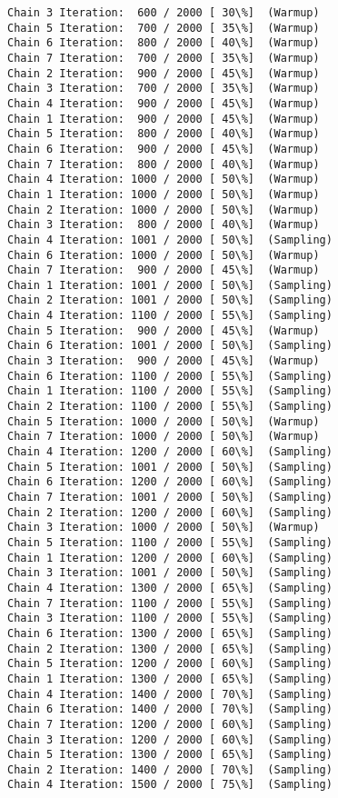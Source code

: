 \documentclass[11pt]{article}
\begin{document}
\begin{Verbatim}[commandchars=\\\{\}]
Chain 3 Iteration:  600 / 2000 [ 30\%]  (Warmup)
Chain 5 Iteration:  700 / 2000 [ 35\%]  (Warmup)
Chain 6 Iteration:  800 / 2000 [ 40\%]  (Warmup)
Chain 7 Iteration:  700 / 2000 [ 35\%]  (Warmup)
Chain 2 Iteration:  900 / 2000 [ 45\%]  (Warmup)
Chain 3 Iteration:  700 / 2000 [ 35\%]  (Warmup)
Chain 4 Iteration:  900 / 2000 [ 45\%]  (Warmup)
Chain 1 Iteration:  900 / 2000 [ 45\%]  (Warmup)
Chain 5 Iteration:  800 / 2000 [ 40\%]  (Warmup)
Chain 6 Iteration:  900 / 2000 [ 45\%]  (Warmup)
Chain 7 Iteration:  800 / 2000 [ 40\%]  (Warmup)
Chain 4 Iteration: 1000 / 2000 [ 50\%]  (Warmup)
Chain 1 Iteration: 1000 / 2000 [ 50\%]  (Warmup)
Chain 2 Iteration: 1000 / 2000 [ 50\%]  (Warmup)
Chain 3 Iteration:  800 / 2000 [ 40\%]  (Warmup)
Chain 4 Iteration: 1001 / 2000 [ 50\%]  (Sampling)
Chain 6 Iteration: 1000 / 2000 [ 50\%]  (Warmup)
Chain 7 Iteration:  900 / 2000 [ 45\%]  (Warmup)
Chain 1 Iteration: 1001 / 2000 [ 50\%]  (Sampling)
Chain 2 Iteration: 1001 / 2000 [ 50\%]  (Sampling)
Chain 4 Iteration: 1100 / 2000 [ 55\%]  (Sampling)
Chain 5 Iteration:  900 / 2000 [ 45\%]  (Warmup)
Chain 6 Iteration: 1001 / 2000 [ 50\%]  (Sampling)
Chain 3 Iteration:  900 / 2000 [ 45\%]  (Warmup)
Chain 6 Iteration: 1100 / 2000 [ 55\%]  (Sampling)
Chain 1 Iteration: 1100 / 2000 [ 55\%]  (Sampling)
Chain 2 Iteration: 1100 / 2000 [ 55\%]  (Sampling)
Chain 5 Iteration: 1000 / 2000 [ 50\%]  (Warmup)
Chain 7 Iteration: 1000 / 2000 [ 50\%]  (Warmup)
Chain 4 Iteration: 1200 / 2000 [ 60\%]  (Sampling)
Chain 5 Iteration: 1001 / 2000 [ 50\%]  (Sampling)
Chain 6 Iteration: 1200 / 2000 [ 60\%]  (Sampling)
Chain 7 Iteration: 1001 / 2000 [ 50\%]  (Sampling)
Chain 2 Iteration: 1200 / 2000 [ 60\%]  (Sampling)
Chain 3 Iteration: 1000 / 2000 [ 50\%]  (Warmup)
Chain 5 Iteration: 1100 / 2000 [ 55\%]  (Sampling)
Chain 1 Iteration: 1200 / 2000 [ 60\%]  (Sampling)
Chain 3 Iteration: 1001 / 2000 [ 50\%]  (Sampling)
Chain 4 Iteration: 1300 / 2000 [ 65\%]  (Sampling)
Chain 7 Iteration: 1100 / 2000 [ 55\%]  (Sampling)
Chain 3 Iteration: 1100 / 2000 [ 55\%]  (Sampling)
Chain 6 Iteration: 1300 / 2000 [ 65\%]  (Sampling)
Chain 2 Iteration: 1300 / 2000 [ 65\%]  (Sampling)
Chain 5 Iteration: 1200 / 2000 [ 60\%]  (Sampling)
Chain 1 Iteration: 1300 / 2000 [ 65\%]  (Sampling)
Chain 4 Iteration: 1400 / 2000 [ 70\%]  (Sampling)
Chain 6 Iteration: 1400 / 2000 [ 70\%]  (Sampling)
Chain 7 Iteration: 1200 / 2000 [ 60\%]  (Sampling)
Chain 3 Iteration: 1200 / 2000 [ 60\%]  (Sampling)
Chain 5 Iteration: 1300 / 2000 [ 65\%]  (Sampling)
Chain 2 Iteration: 1400 / 2000 [ 70\%]  (Sampling)
Chain 4 Iteration: 1500 / 2000 [ 75\%]  (Sampling)

\end{Verbatim}
\end{document}
